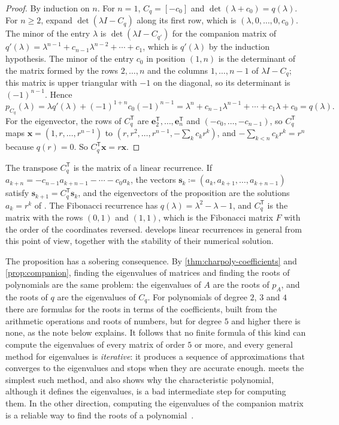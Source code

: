\begin{proof}
By induction on $n$. For $n=1$, $C_q=[-c_0]$ and $\det(\lambda+c_0)=q(\lambda)$. For $n\ge2$, expand $\det(\lambda I-C_q)$ along its first row, which is $(\lambda,0,\ldots,0,c_0)$. The minor of the entry $\lambda$ is $\det(\lambda I-C_{q'})$ for the companion matrix of $q'(\lambda)=\lambda^{n-1}+c_{n-1}\lambda^{n-2}+\cdots+c_1$, which is $q'(\lambda)$ by the induction hypothesis. The minor of the entry $c_0$ in position $(1,n)$ is the determinant of the matrix formed by the rows $2,\ldots,n$ and the columns $1,\ldots,n-1$ of $\lambda I-C_q$; this matrix is upper triangular with $-1$ on the diagonal, so its determinant is $(-1)^{n-1}$. Hence
\[
p_{C_q}(\lambda)=\lambda q'(\lambda)+(-1)^{1+n}c_0(-1)^{n-1}=\lambda^n+c_{n-1}\lambda^{n-1}+\cdots+c_1\lambda+c_0=q(\lambda).
\]
For the eigenvector, the rows of $C_q^{\mathsf T}$ are $\mathbf e_2^{\mathsf T},\ldots,\mathbf e_n^{\mathsf T}$ and $(-c_0,\ldots,-c_{n-1})$, so $C_q^{\mathsf T}$ maps $\mathbf x=(1,r,\ldots,r^{n-1})$ to $(r,r^2,\ldots,r^{n-1},-\sum_kc_kr^k)$, and $-\sum_{k<n}c_kr^k=r^n$ because $q(r)=0$. So $C_q^{\mathsf T}\mathbf x=r\mathbf x$.
\end{proof}

The transpose $C_q^{\mathsf T}$ is the matrix of a linear recurrence. If $a_{k+n}=-c_{n-1}a_{k+n-1}-\cdots-c_0a_k$, the vectors $\mathbf s_k\coloneqq(a_k,a_{k+1},\ldots,a_{k+n-1})$ satisfy $\mathbf s_{k+1}=C_q^{\mathsf T}\mathbf s_k$, and the eigenvectors of the proposition are the solutions $a_k=r^k$ of . The Fibonacci recurrence has $q(\lambda)=\lambda^2-\lambda-1$, and $C_q^{\mathsf T}$ is the matrix with the rows $(0,1)$ and $(1,1)$, which is the Fibonacci matrix $F$ with the order of the coordinates reversed.  develops linear recurrences in general from this point of view, together with the stability of their numerical solution.

The proposition has a sobering consequence. By \cref{thm:charpoly-coefficients} and \cref{prop:companion}, finding the eigenvalues of matrices and finding the roots of polynomials are the same problem: the eigenvalues of $A$ are the roots of $p_A$, and the roots of $q$ are the eigenvalues of $C_q$. For polynomials of degree $2$, $3$ and $4$ there are formulas for the roots in terms of the coefficients, built from the arithmetic operations and roots of numbers, but for degree $5$ and higher there is none, as the note below explains. It follows that no finite formula of this kind can compute the eigenvalues of every matrix of order $5$ or more, and every general method for eigenvalues is \emph{iterative}: it produces a sequence of approximations that converges to the eigenvalues and stops when they are accurate enough.  meets the simplest such method, and also shows why the characteristic polynomial, although it defines the eigenvalues, is a bad intermediate step for computing them. In the other direction, computing the eigenvalues of the companion matrix is a reliable way to find the roots of a polynomial~\cite{edelman1995}.

